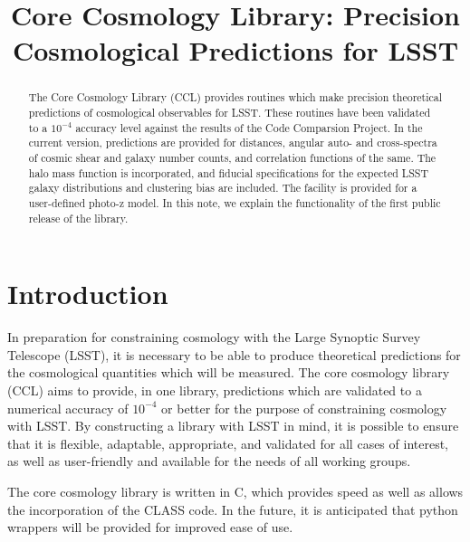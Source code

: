 \documentclass[\docopts]{\docclass}
\begin{document}
 

\title{Core Cosmology Library: Precision Cosmological Predictions for LSST}

\maketitlepre

\begin{abstract}
 
The Core Cosmology Library (CCL) provides routines which make precision theoretical predictions of cosmological observables for LSST. These routines have been validated to a $10^{-4}$ accuracy level against the results of the Code Comparsion Project. In the current version, predictions are provided for distances, angular auto- and cross-spectra of cosmic shear and galaxy number counts, and correlation functions of the same. The halo mass function is incorporated, and fiducial specifications for the expected LSST galaxy distributions and clustering bias are included. The facility is provided for a user-defined photo-z model. In this note, we explain the functionality of the first public release of the library. 

\end{abstract}


\maketitlepost

\section{Introduction}
\label{sec:intro}
In preparation for constraining cosmology with the Large Synoptic Survey Telescope (LSST), it is necessary to be able to produce theoretical predictions for the cosmological quantities which will be measured. The core cosmology library (CCL) aims to provide, in one library, predictions which are validated to a numerical accuracy of $10^{-4}$ or better for the purpose of constraining cosmology with LSST. By constructing a library with LSST in mind, it is possible to ensure that it is flexible, adaptable, appropriate, and validated for all cases of interest, as well as user-friendly and available for the needs of all working groups. 

The core cosmology library is written in C, which provides speed as well as allows the incorporation of the CLASS \cite{class} code. In the future, it is anticipated that python wrappers will be provided for improved ease of use. 

\end{document}
